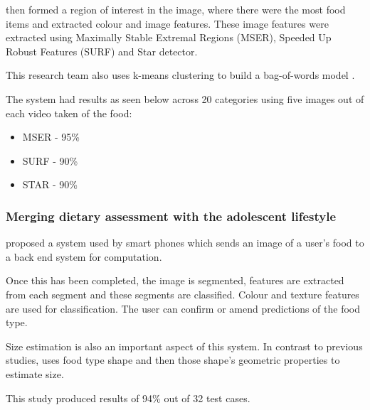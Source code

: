 \parencite{chen2010toward} then formed a region of interest in the image, where there were the most food items and extracted colour and image features.
These image features were extracted using Maximally Stable Extremal Regions (MSER), Speeded Up Robust Features (SURF) and Star detector.

This research team also uses k-means clustering to build a bag-of-words model \parencite{chen2010toward}.

The system had results as seen below across 20 categories using five images out of each video taken of the food:
\begin{itemize}
	\item{MSER - 95\%}
	\item{SURF - 90\%}
	\item{STAR - 90\%}
\end{itemize}




\subsubsection*{Merging dietary assessment with the adolescent lifestyle}
\parencite{schap2014merging} proposed a system used by smart phones which sends an image of a user's food to a back end system for computation.

Once this has been completed, the image is segmented, features are extracted from each segment and these segments are classified.
Colour and texture features are used for classification.
The user can confirm or amend predictions of the food type.

Size estimation is also an important aspect of this system.
In contrast to previous studies, \parencite{snap} uses food type shape and then those shape's geometric properties to estimate size.

This study produced results of 94\% out of 32 test cases.
